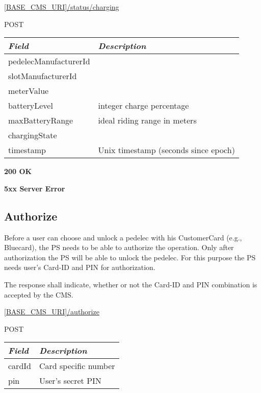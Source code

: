  \url{[BASE_CMS_URI]/status/charging}

 POST

\newpage
{}
\begin{table}[!h]
\vspace{-7mm}
\begin{tabularx}{\linewidth}{ | l | X | }
  \hline
  \textit{Field} & \textit{Description} \\
  \hline \hline
  	pedelecManufacturerId			& \\
  	slotManufacturerId					& \\
  	meterValue & \\
  	batteryLevel & integer charge percentage \\
  	maxBatteryRange & ideal riding range in meters \\
  	chargingState			& \\
 	timestamp			& Unix timestamp (seconds since epoch) \\
  	
    \hline
\end{tabularx}
\end{table}

 \textbf{200 OK}

 \textbf{5xx Server Error}

\subsection{Authorize}

Before a user can choose and unlock a pedelec with his CustomerCard (e.g., Bluecard), the \acs{PS} needs to be able to authorize the operation. Only after authorization the \acs{PS} will be able to unlock the pedelec. For this purpose the \acs{PS} needs user's Card-ID and PIN for authorization.

The response shall indicate, whether or not the Card-ID and PIN combination is accepted by the \acs{CMS}.

 \url{[BASE_CMS_URI]/authorize}

 POST

\begin{table}[!h]
\vspace{-7mm}
\begin{tabularx}{\linewidth}{ | l | X | }
  \hline
  \textit{Field} & \textit{Description} \\
  \hline \hline
  	cardId 		& Card specific number\\
  	pin			& User's secret PIN \\
    \hline
\end{tabularx}
\end{table}

